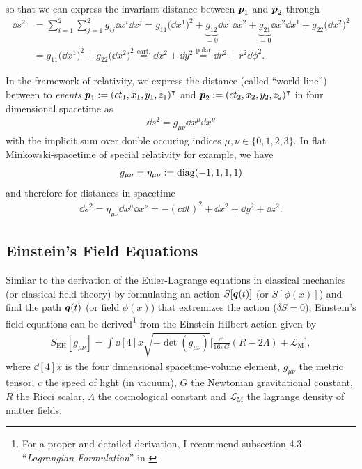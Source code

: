 so that we can express the invariant distance between $\vb*{p}_{1}$ and $\vb*{p}_{2}$ through
\begin{align}
    \dd{s}^2 &= \sum_{i = 1}^{2} \sum_{j = 1}^{2} g_{ij}\dd{x}^{i}\dd{x}^{j} = g_{11} \bigl(\dd{x}^{1}\bigr)^2 + \underbrace{g_{12}}_{= 0} \dd{x}^{1}\dd{x}^{2} + \underbrace{g_{21}}_{= 0} \dd{x}^{2} \dd{x}^{1} + g_{22} \bigl(\dd{x}^{2} \bigr)^2 \\
             &= g_{11} \bigl(\dd{x}^{1}\bigr)^2 + g_{22} \bigl(\dd{x}^{2}\bigr)^2 \overset{\text{cart.}}{=} \dd{x}^{2} + \dd{y}^{2} \overset{\text{polar}}{=} \dd{r}^{2} + r^2 \dd{\phi}^{2}.  
\end{align}

\noindent In the framework of relativity, we express the distance (called ``world line'') between to \textit{events} $\vb*{p}_{1} := (c t_{1}, x_{1}, y_{1}, z_{1})^{\intercal}$ and $\vb*{p}_{2} := (c t_{2}, x_{2}, y_{2}, z_{2})^{\intercal}$ in four dimensional spacetime as
\begin{align}
    \dd{s}^2 = g_{\mu\nu} \dd{x}^{\mu} \dd{x}^{\nu}
\end{align}
with the implicit sum over double occuring indices $\mu, \nu \in \{0,1,2,3\}$. In flat Minkowski-spacetime of special relativity for example, we have 
\begin{align}
    g_{\mu\nu} = \eta_{\mu\nu} := \operatorname{diag}(-1, 1, 1, 1) 
\end{align} 
and therefore for distances in spacetime
\begin{align}
    \dd{s}^2 = \eta_{\mu\nu} \dd{x}^{\mu} \dd{x}^{\nu} = - (c \dd{t})^{2} + \dd{x}^{2} + \dd{y}^{2} + \dd{z}^{2}.    
\end{align}



\subsection{Einstein's Field Equations}

\noindent Similar to the derivation of the Euler-Lagrange equations in classical mechanics (or classical field theory) by formulating an action $S[\vb*{q}(t)]$ (or $S[\phi(x)]$) and find the path $\vb*{q}(t)$ (or field $\phi(x)$) that extremizes the action ($\delta S = 0$), Einstein's field equations can be derived\footnote{For a proper and detailed derivation, I recommend subsection 4.3 ``\textit{Lagrangian Formulation}'' in \cite[p.~159]{SeanCarroll2019}} from the Einstein-Hilbert action given by
\begin{align}
    S_{\text{EH}}[g_{\mu\nu}] = \int \dd[4]{x} \sqrt{-\det(g_{\mu\nu})} \biggl[\frac{c^4}{16\pi G}(R - 2\Lambda) + \mathcal{L}_{\text{M}} \biggr], 
\end{align}
where $\dd[4]{x}$ is the four dimensional spacetime-volume element, $g_{\mu\nu}$ the metric tensor, $c$ the speed of light (in vacuum), $G$ the Newtonian gravitational constant, $R$ the Ricci scalar, $\Lambda$ the cosmological constant and $\mathcal{L}_{\text{M}}$ the lagrange density of matter fields. 

